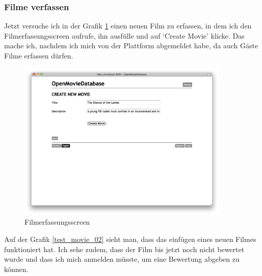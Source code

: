 \clearpage

\subsubsection{Filme verfassen}
Jetzt versuche ich in der Grafik \ref{test_movie_01} einen neuen Film zu erfassen, 
in dem ich den Filmerfassungsscreen aufrufe, ihn ausfülle und auf `Create Movie' klicke.
Das mache ich, nachdem ich mich von der Plattform abgemeldet habe, da auch Gäste
Filme erfassen dürfen.

\begin{figure}[ht]
    \begin{center}
        \includegraphics[width=0.9\textwidth,angle=0]{./bilder/tests/test_movie_01.png}
        \caption{Filmerfassungsscreen}
        \label{test_movie_01}
    \end{center}
\end{figure}

Auf der Grafik \ref{test_movie_02} sieht man, dass das einfügen eines neuen
Filmes funktioniert hat. Ich sehe zudem, dass der Film bis jetzt noch nicht
bewertet wurde und dass ich mich anmelden müsste, um eine Bewertung abgeben zu
können.

